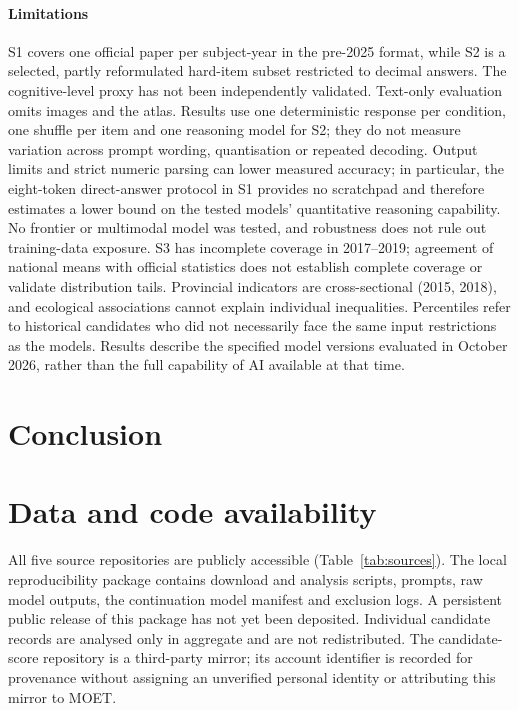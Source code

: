 \documentclass[preprint,12pt,authoryear,nonatbib]{elsarticle}
\begin{document}
\paragraph{Limitations} S1 covers one official paper per subject-year in the pre-2025 format, while S2 is a selected, partly reformulated hard-item subset restricted to decimal answers. The cognitive-level proxy has not been independently validated. Text-only evaluation omits images and the atlas. Results use one deterministic response per condition, one shuffle per item and one reasoning model for S2; they do not measure variation across prompt wording, quantisation or repeated decoding. Output limits and strict numeric parsing can lower measured accuracy; in particular, the eight-token direct-answer protocol in S1 provides no scratchpad and therefore estimates a lower bound on the tested models' quantitative reasoning capability. No frontier or multimodal model was tested, and robustness does not rule out training-data exposure. S3 has incomplete coverage in 2017--2019; agreement of national means with official statistics does not establish complete coverage or validate distribution tails. Provincial indicators are cross-sectional (2015, 2018), and ecological associations cannot explain individual inequalities. Percentiles refer to historical candidates who did not necessarily face the same input restrictions as the models. Results describe the specified model versions evaluated in October 2026, rather than the full capability of AI available at that time.

\section{Conclusion}


\section*{Data and code availability}\label{sec:availability}
All five source repositories are publicly accessible (Table~\ref{tab:sources}). The local reproducibility package contains download and analysis scripts, prompts, raw model outputs, the continuation model manifest and exclusion logs. A persistent public release of this package has not yet been deposited. Individual candidate records are analysed only in aggregate and are not redistributed. The candidate-score repository is a third-party mirror; its account identifier is recorded for provenance without assigning an unverified personal identity or attributing this mirror to MOET.
\end{document}
